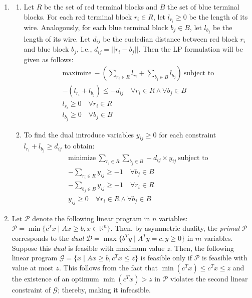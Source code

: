 \documentclass{article}
\begin{document}
\begin{enumerate}[leftmargin={*}, font={\bf}, label={\arabic*.}, ref={\arabic*}]
  \item \label{qst:1}
    \begin{enumerate}
      \item \label{qst:1a}
        Let $R$ be the set of red terminal blocks and $B$ the set of blue terminal blocks.
        For each red terminal block $r_i \in R$, let $l_{r_i} \geq 0$ be the length of its
        wire. Analogously, for each blue terminal block $b_j \in B$, let $l_{b_j}$ be the
        length of its wire. Let $d_{ij}$ be the eucledian distance between red block $r_i$
        and blue block $b_j$, i.e., $d_{ij} = || r_i - b_j||$. Then the LP formulation will
        be given as follows:
        \begin{gather*}
          \text{maximize}\ -\left(\sum_{r_i \in R} l_{r_i} + \sum_{b_j \in B} l_{b_j}\right)\ \text{subject to} \\
          -\left(l_{r_i} + l_{b_j}\right) \leq -d_{ij} \quad \forall r_i \in R \land \forall b_j \in B \\
          l_{r_i} \geq 0 \quad \forall r_i \in R \\
          l_{b_j} \geq 0 \quad \forall b_j \in B
        \end{gather*}

      \item \label{qst:1b}
        To find the dual introduce variables $y_{ij} \geq 0$ for each constraint
        $l_{r_i} + l_{b_j} \geq d_{ij}$ to obtain:
        \begin{gather*}
          \text{minimize}\ \sum_{r_i \in R} \sum_{b_j \in B} -d_{ij} \times y_{ij}\ \text{subject to} \\
          -\sum_{r_i \in R} y_{ij} \geq -1 \quad \forall b_j \in B \\
          -\sum_{b_j \in B} y_{ij} \geq -1 \quad \forall r_i \in R \\
          y_{ij} \geq 0 \quad \forall r_i \in R \land \forall b_j \in B
        \end{gather*}
    \end{enumerate}

  \item \label{qst:2}
    Let $\mathcal{P}$ denote the following linear program in $n$ variables: $\mathcal{P}
    = \min\{c^Tx \mid Ax \geq b, x \in \mathbb{R}^n\}$. Then, by asymmetric duality, the
    \textit{primal} $\mathcal{P}$ corresponds to the \textit{dual} $\mathcal{D} = \max\{
    b^Ty \mid A^Ty = c, y \geq 0\}$ in $m$ variables. Suppose this \textit{dual} is
    feasible with maximum value $z$. Then, the following linear program $\mathcal{G} = \{
    x \mid Ax \geq b, c^Tx \leq z\}$ is feasible only if $\mathcal{P}$ is feasible with
    value at most $z$. This follows from the fact that $\min(c^Tx) \leq c^Tx \leq z$ and
    the existence of an optimum $\min(c^Tx) > z$ in $\mathcal{P}$ violates the second
    linear constraint of $\mathcal{G}$; thereby, making it infeasible.


\end{enumerate}
\end{document}
